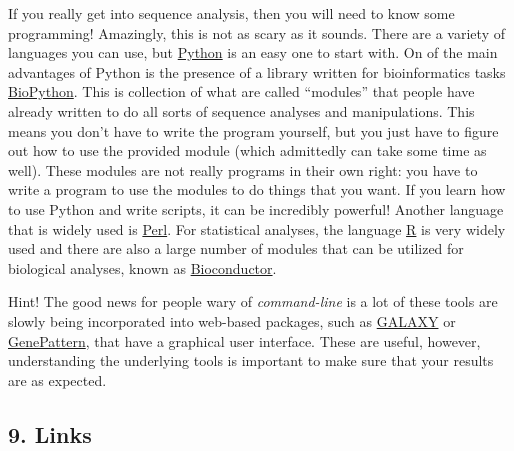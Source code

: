 \documentclass[]{article}
\begin{document}
If you really get into sequence analysis, then you will need to know
some programming! Amazingly, this is not as scary as it sounds. There
are a variety of languages you can use, but
\href{https://www.python.org/}{Python} is an easy one to start with. On
of the main advantages of Python is the presence of a library written
for bioinformatics tasks \href{http://www.biopython.org/}{BioPython}.
This is collection of what are called ``modules'' that people have
already written to do all sorts of sequence analyses and manipulations.
This means you don't have to write the program yourself, but you just
have to figure out how to use the provided module (which admittedly can
take some time as well). These modules are not really programs in their
own right: you have to write a program to use the modules to do things
that you want. If you learn how to use Python and write scripts, it can
be incredibly powerful! Another language that is widely used is
\href{http://www.perl.org/}{Perl}. For statistical analyses, the
language \href{http://www.r-project.org/}{R} is very widely used and
there are also a large number of modules that can be utilized for
biological analyses, known as
\href{http://www.bioconductor.org/}{Bioconductor}.

Hint! The good news for people wary of \emph{command-line} is a lot of
these tools are slowly being incorporated into web-based packages, such
as \href{http://usegalaxy.org}{GALAXY} or
\href{https://www.broadinstitute.org/cancer/software/genepattern/}{GenePattern},
that have a graphical user interface. These are useful, however,
understanding the underlying tools is important to make sure that your
results are as expected.

\subsection{9. Links}\label{links}
\end{document}
